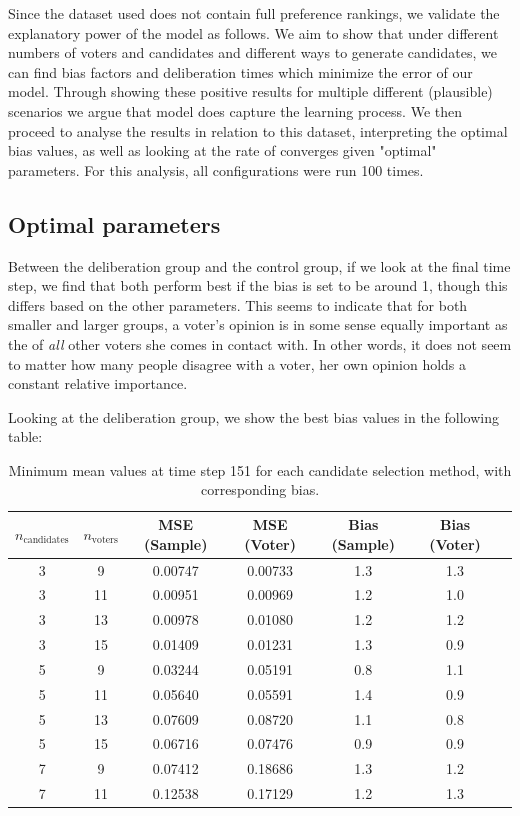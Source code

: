 Since the dataset used does not contain full preference rankings, we validate
the explanatory power of the model as follows. We aim to show that under
different numbers of voters and candidates and different ways to generate
candidates, we can find bias factors and deliberation times which minimize the
error of our model. Through showing these positive results for multiple
different (plausible) scenarios we argue that model does capture the learning
process. We then proceed to analyse the results in relation to this dataset,
interpreting the optimal bias values, as well as looking at the rate of
converges given "optimal" parameters. For this analysis, all configurations
were run 100 times. 


\subsection{Optimal parameters}

Between the deliberation group and the control group, if we look at the final
time step, we find that both perform best if the bias is set to be around 1,
though this differs based on the other parameters. This seems to indicate that
for both smaller and larger groups, a voter's opinion is in some sense equally
important as the of  \textit{all} other voters she comes in contact with. In
other words, it does not seem to matter how many people disagree with a voter,
her own opinion holds a constant relative importance.

Looking at the deliberation group, we show the best bias values in the following table:
\begin{table}[ht]
\centering
\begin{tabular}{ccccccc}
\toprule
$n_\text{candidates}$ & $n_\text{voters}$ & MSE (Sample) & MSE (Voter) & Bias (Sample) & Bias (Voter) \\
\midrule
3 & 9  & 0.00747 & 0.00733 & 1.3 & 1.3 \\
3 & 11 & 0.00951 & 0.00969 & 1.2 & 1.0 \\
3 & 13 & 0.00978 & 0.01080 & 1.2 & 1.2 \\
3 & 15 & 0.01409 & 0.01231 & 1.3 & 0.9 \\
5 & 9  & 0.03244 & 0.05191 & 0.8 & 1.1 \\
5 & 11 & 0.05640 & 0.05591 & 1.4 & 0.9 \\
5 & 13 & 0.07609 & 0.08720 & 1.1 & 0.8 \\
5 & 15 & 0.06716 & 0.07476 & 0.9 & 0.9 \\
7 & 9  & 0.07412 & 0.18686 & 1.3 & 1.2 \\
7 & 11 & 0.12538 & 0.17129 & 1.2 & 1.3 \\
\bottomrule
\end{tabular}
\caption{Minimum mean values at time step 151 for each candidate selection method, with corresponding bias.}
\label{tab:min_mean_bias_delib}
\end{table}

